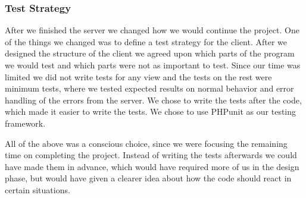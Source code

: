 \subsubsection{Test Strategy}
After we finished the server we changed how we would continue the project.
One of the things we changed was to define a test strategy for the client.
After we designed the structure of the client we agreed upon which parts of the program we would test and which parts were not as important to test.
Since our time was limited we did not write tests for any view  and the tests on the rest were minimum tests, where we tested expected results on normal behavior and error handling of the errors from the server.
We chose to write the tests after the code, which made it easier to write the tests. We chose to use PHPunit as our testing framework.

All of the above was a conscious choice, since we were focusing the remaining time on completing the project.
Instead of writing the tests afterwards we could have made them in advance, which would have required more of us in the design phase, but would have given a clearer idea about how the code should react in certain situations.

